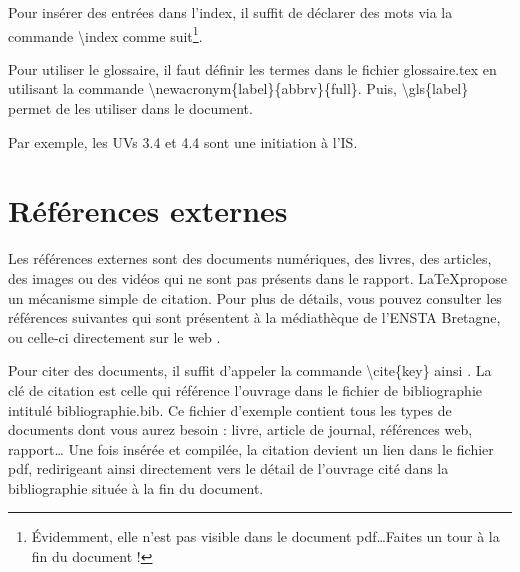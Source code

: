 Pour insérer des entrées dans l'index, il suffit de déclarer des mots via la commande \textsf{\textbackslash index} comme suit\footnote{Évidemment, elle n'est pas visible dans le document pdf\dots Faites un tour à la fin du document !}. 

Pour utiliser le glossaire, il faut définir les termes dans le fichier \textsf{glossaire.tex} en utilisant la commande \textsf{\textbackslash newacronym\{label\}\{abbrv\}\{full\}}. 
Puis,  \textsf{\textbackslash gls\{label\}} permet de les utiliser dans le document. 


Par exemple, les UVs 3.4 et 4.4 sont une initiation à l'\gls{IS}.


\section{Références externes}

Les références externes sont des documents numériques, des livres, des articles, des images ou des vidéos qui ne sont pas présents dans le rapport. 
\LaTeX propose un mécanisme simple de citation.
Pour plus de détails, vous pouvez consulter les références suivantes \cite{maguis2010redigez,desgraupes2003latex,bitouze2010latex} qui sont présentent à la médiathèque de l'ENSTA Bretagne, ou celle-ci directement sur le web \cite{openclassroomLaTeX}.  

Pour citer des documents, il suffit d'appeler la commande \textsf{\textbackslash cite\{key\}} ainsi \cite{lamport1985i1}. 
La clé de citation est celle qui référence l'ouvrage dans le fichier de bibliographie intitulé   \textsf{bibliographie.bib}.
Ce fichier d'exemple contient tous les types de documents dont vous aurez besoin : livre, article de journal, références web,  rapport\dots 
Une fois insérée et compilée, la citation devient un lien dans le fichier pdf, redirigeant ainsi directement vers le détail de l'ouvrage cité dans la bibliographie située à la fin du document.
 
